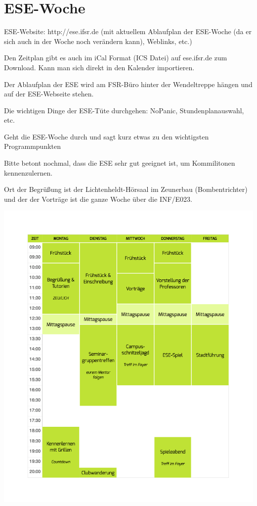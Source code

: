 \documentclass[a4paper,12pt]{report}
\begin{document}
\section{ESE-Woche}
\begin{itemize*}
\item ESE-Website: http://ese.ifsr.de (mit aktuellem Ablaufplan der ESE-Woche (da er sich auch in der Woche noch verändern kann), Weblinks, etc.)
\item Den Zeitplan gibt es auch im iCal Format (ICS Datei) auf ese.ifsr.de zum Download.
Kann man sich direkt in den Kalender importieren.
\item Der Ablaufplan der ESE wird am FSR-Büro hinter der Wendeltreppe hängen und auf der ESE-Webseite stehen.
\item Die wichtigen Dinge der ESE-Tüte durchgehen: NoPanic, Stundenplanauswahl, etc.
\item Geht die ESE-Woche durch und sagt kurz etwas zu den wichtigsten Programmpunkten
\item Bitte betont nochmal, dass die ESE sehr gut geeignet ist, um Kommilitonen kennenzulernen.
\end{itemize*}
\vspace{0.5cm}
Ort der Begrüßung ist der Lichtenheldt-Hörsaal im Zeunerbau (Bombentrichter) und der der Vorträge ist die ganze Woche über die INF/E023.

\includegraphics[width=\linewidth]{./zeitplan.png}
\end{document}
